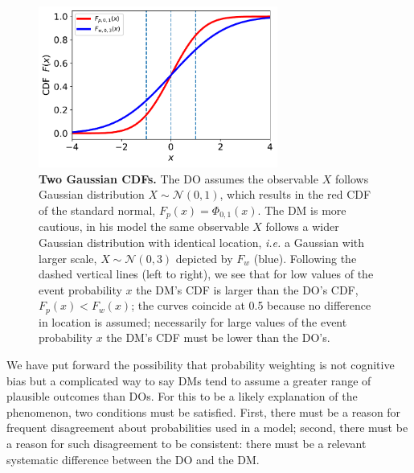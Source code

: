 \documentclass[%
	11pt,
	abstract=true,	
	bibliography=oldstyle					%
]{scrartcl}
\newcommand{\bsf}[1]{\textsf{\textbf{#1}}}		%
\newcommand{\flabel}[1]{\label{fig:#1}}
\newcommand{\ie}{\textit{i.e.}\xspace}
\newcommand{\ND}{\mathcal{N}} %
\numberwithin{equation}{section}
\begin{document}


\begin{figure}[!htb]
\centering
\includegraphics[width=0.7\textwidth]{./figs/TwoCDFs.pdf}
\caption{\bsf{Two Gaussian CDFs.} The DO assumes the observable $X$ follows Gaussian distribution $X \sim \ND(0,1)$, which results in the red CDF of the standard normal, $F_p(x) = \Phi_{0,1}(x)$. The DM is more cautious, in his model the same observable $X$ follows a wider Gaussian distribution with identical location, \ie a Gaussian with larger scale, $X \sim \ND(0,3)$ depicted by $F_w$ (blue). 
% 
Following the dashed vertical lines (left to right), we see that for low values of the event probability $x$ the DM's CDF is larger than the DO's CDF, $F_p(x) < F_w(x)$; the curves coincide at 0.5 because no difference in location is assumed; necessarily for large values of the event probability $x$ the DM's CDF must be lower than the DO's.}
\flabel{TwoCDFs}
\end{figure}


We have put forward the possibility that probability weighting is not cognitive bias but a complicated way to say DMs tend to assume a greater range of plausible outcomes than DOs. For this to be a likely explanation of the phenomenon, two conditions must be satisfied. First, there must be a reason for frequent disagreement about probabilities used in a model; second, there must be a reason for such disagreement to be consistent: there must be a relevant systematic difference between the DO and the DM. 
\end{document}
